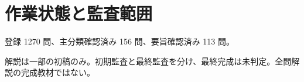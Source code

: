 \chapter{作業状態と監査範囲}
登録 1270 問、主分類確認済み 156 問、要旨確認済み 113 問。
\par 解説は一部の初稿のみ。初期監査と最終監査を分け、最終完成は未判定。全問解説の完成教材ではない。
